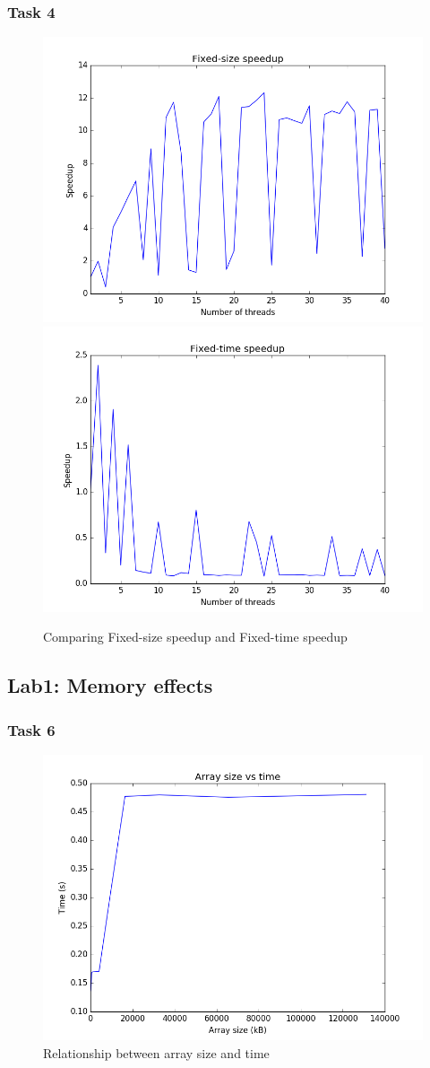 \documentclass[12pt]{article}
\begin{document}
  \subsubsection*{Task 4}
    \begin{figure}[ht]
      \centering
      \includegraphics[width=0.45\linewidth]{lab1_task4_fixedsize}\hfill
      \includegraphics[width=0.45\linewidth]{lab1_task4_fixedtime}
      \caption{Comparing Fixed-size speedup and Fixed-time speedup}
      \label{fig:task4_speedup}
    \end{figure}

\subsection*{Lab1: Memory effects}

  \subsubsection*{Task 6}
    \begin{figure}[ht]
      \centering
      \includegraphics[width=0.5\linewidth]{lab1_task6}
      \caption{Relationship between array size and time}
      \label{fig:task6_memory}
    \end{figure}
\end{document}
